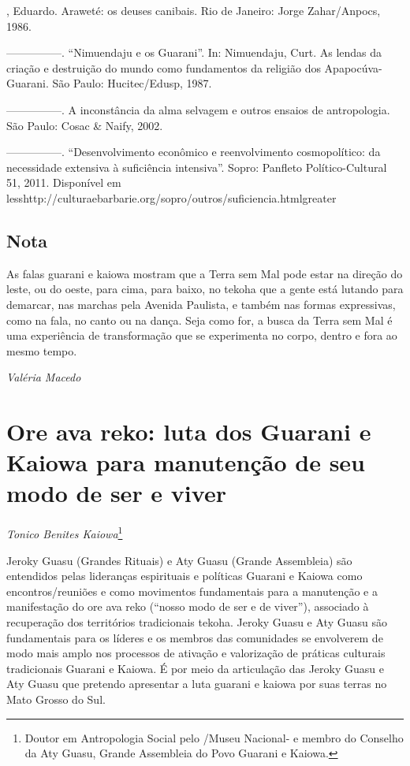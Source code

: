 \begin{Parskip}
  , Eduardo. Araweté: os deuses canibais. Rio de
Janeiro: Jorge Zahar/Anpocs, 1986.

—————. ``Nimuendaju e os Guarani''. In: Nimuendaju, Curt. As lendas
da criação e destruição do mundo como fundamentos da religião dos
Apapocúva-Guarani. São Paulo: Hucitec/Edusp, 1987.

—————. A inconstância da alma selvagem e outros ensaios de
antropologia. São Paulo: Cosac \& Naify, 2002.

—————. ``Desenvolvimento econômico e reenvolvimento cosmopolítico:
da necessidade extensiva à suficiência intensiva''. Sopro: Panfleto
Político-Cultural 51, 2011. Disponível em
{less}http://culturaebarbarie.org/sopro/outros/suficiencia.html{greater}
\end{Parskip}

\section{Nota}
As falas guarani e kaiowa mostram que a Terra sem Mal pode estar na
direção do leste, ou do oeste, para cima, para baixo, no tekoha que a
gente está lutando para demarcar, nas marchas pela Avenida Paulista, e
também nas formas expressivas, como na fala, no canto ou na dança. Seja
como for, a busca da Terra sem Mal é uma experiência de transformação
que se experimenta no corpo, dentro e fora ao mesmo tempo.
\medskip
\begin{flushright}
\emph{Valéria Macedo}
\end{flushright}

\chapter{Ore ava reko: luta dos Guarani e Kaiowa para
manutenção de seu modo de ser e viver}

\begin{flushright}
\emph{Tonico Benites Kaiowa}\footnote{Doutor em Antropologia Social pelo
/Museu Nacional- e membro do Conselho da Aty Guasu, Grande
Assembleia do Povo Guarani e Kaiowa.}
\end{flushright}
\bigskip

Jeroky Guasu (Grandes Rituais) e Aty Guasu (Grande Assembleia) são
entendidos pelas lideranças espirituais e políticas Guarani e Kaiowa
como encontros/reuniões e como movimentos fundamentais para a
manutenção e a manifestação do ore ava reko (``nosso modo de ser e de
viver''), associado à recuperação dos territórios tradicionais tekoha.
Jeroky Guasu e Aty Guasu são fundamentais para os líderes e os membros
das comunidades se envolverem de modo mais amplo nos processos de
ativação e valorização de práticas culturais tradicionais Guarani e
Kaiowa. É por meio da articulação das Jeroky Guasu e Aty Guasu que
pretendo apresentar a luta guarani e kaiowa por suas terras no Mato
Grosso do Sul. 

